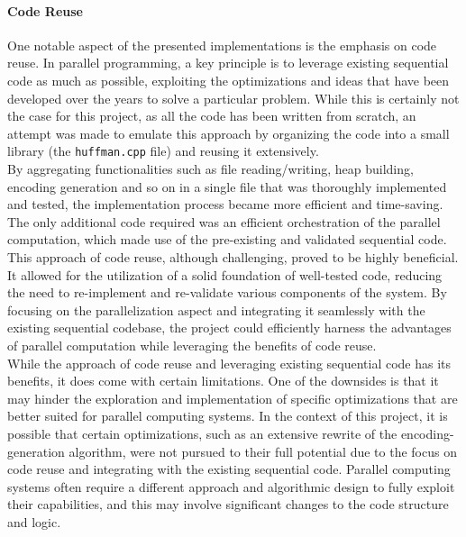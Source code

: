 \documentclass[10pt]{article}
\begin{document}
\paragraph{Code Reuse} One notable aspect of the presented implementations is the emphasis on code reuse. In parallel programming, a key principle is to leverage existing sequential code as much as possible, exploiting the optimizations and ideas that have been developed over the years to solve a particular problem. While this is certainly not the case for this project, as all the code has been written from scratch, an attempt was made to emulate this approach by organizing the code into a small library (the \texttt{huffman.cpp} file) and reusing it extensively.\\
By aggregating functionalities such as file reading/writing, heap building, encoding generation and so on in a single file that was thoroughly implemented and tested, the implementation process became more efficient and time-saving. The only additional code required was an efficient orchestration of the parallel computation, which made use of the pre-existing and validated sequential code.\\
This approach of code reuse, although challenging, proved to be highly beneficial. It allowed for the utilization of a solid foundation of well-tested code, reducing the need to re-implement and re-validate various components of the system. By focusing on the parallelization aspect and integrating it seamlessly with the existing sequential codebase, the project could efficiently harness the advantages of parallel computation while leveraging the benefits of code reuse.\\
While the approach of code reuse and leveraging existing sequential code has its benefits, it does come with certain limitations. One of the downsides is that it may hinder the exploration and implementation of specific optimizations that are better suited for parallel computing systems. In the context of this project, it is possible that certain optimizations, such as an extensive rewrite of the encoding-generation algorithm, were not pursued to their full potential due to the focus on code reuse and integrating with the existing sequential code. Parallel computing systems often require a different approach and algorithmic design to fully exploit their capabilities, and this may involve significant changes to the code structure and logic.
\end{document}
